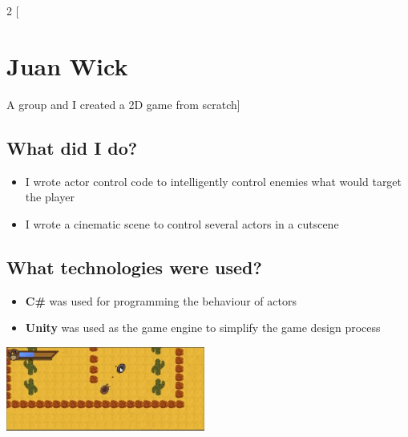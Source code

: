 \documentclass{article}
\begin{document}
\begin{multicols}{2}
    [\section*{Juan Wick}
    A group and I created a 2D game from scratch]
    
    \subsection*{What did I do?}
    \begin{itemize}
        \item I wrote actor control code to intelligently control enemies what would target the player
        \item I wrote a cinematic scene to control several actors in a cutscene
    \end{itemize}
    \subsection*{What technologies were used?}
    \begin{itemize}
        \item \textbf{C\#} was used for programming the behaviour of actors
        \item \textbf{Unity} was used as the game engine to simplify the game design process
    \end{itemize}    
    \begin{center}
        \includegraphics[width=0.49\textwidth, trim={0, 0, 8cm, 0}, clip]{images/juan_wick.png}
    \end{center}
\end{multicols}
    
    
\end{document}
